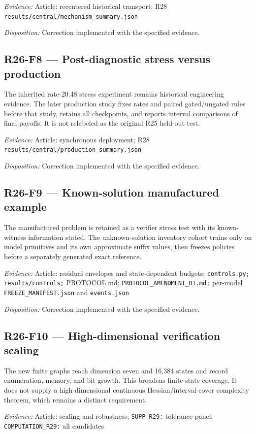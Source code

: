 \emph{Evidence:} Article: recentered historical transport; R28 \nolinkurl{results/central/mechanism_summary.json}

\emph{Disposition:} Correction implemented with the specified evidence.
\subsection{R26-F8 --- Post-diagnostic stress versus production}
The inherited rate-20.48 stress experiment remains historical engineering evidence. The later production study fixes rates and paired gated/ungated rules before that study, retains all checkpoints, and reports interval comparisons of final payoffs. It is not relabeled as the original R25 held-out test.

\emph{Evidence:} Article: synchronous deployment; R28 \nolinkurl{results/central/production_summary.json}

\emph{Disposition:} Correction implemented with the specified evidence.
\subsection{R26-F9 --- Known-solution manufactured example}
The manufactured problem is retained as a verifier stress test with its known-witness information stated. The unknown-solution inventory cohort trains only on model primitives and its own approximate suffix values, then freezes policies before a separately generated exact reference.

\emph{Evidence:} Article: residual envelopes and state-dependent budgets; \nolinkurl{controls.py;} \nolinkurl{results/controls;} PROTOCOL.md; \nolinkurl{PROTOCOL_AMENDMENT_01.md;} per-model \nolinkurl{FREEZE_MANIFEST.json} and \nolinkurl{events.json}

\emph{Disposition:} Correction implemented with the specified evidence.
\subsection{R26-F10 --- High-dimensional verification scaling}
The new finite graphs reach dimension seven and 16,384 states and record enumeration, memory, and bit growth. This broadens finite-state coverage. It does not supply a high-dimensional continuous Hessian/interval-cover complexity theorem, which remains a distinct requirement.

\emph{Evidence:} Article: scaling and robustness; \nolinkurl{SUPP_R29:} tolerance panel; \nolinkurl{COMPUTATION_R29:} all candidates

